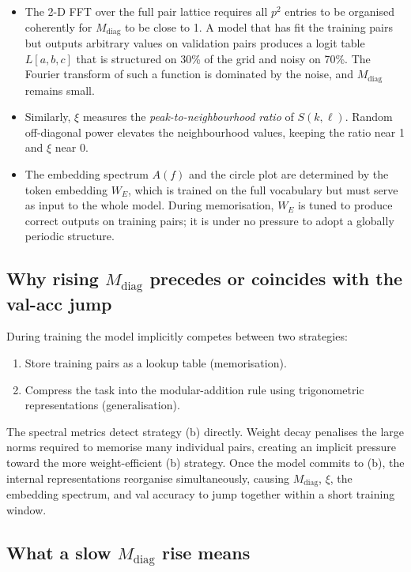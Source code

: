 \documentclass[11pt]{article}
\newcommand{\diag}{\mathrm{diag}}
\begin{document}
\begin{itemize}
    \item The 2-D FFT over the full pair lattice requires all $p^2$ entries
    to be organised coherently for $M_{\diag}$ to be close to 1.
    A model that has fit the training pairs but outputs arbitrary values on
    validation pairs produces a logit table $L[a,b,c]$ that is structured
    on 30\% of the grid and noisy on 70\%.
    The Fourier transform of such a function is dominated by the noise, and
    $M_{\diag}$ remains small.

    \item Similarly, $\xi$ measures the \emph{peak-to-neighbourhood ratio}
    of $S(k,\ell)$.
    Random off-diagonal power elevates the neighbourhood values, keeping the
    ratio near 1 and $\xi$ near 0.

    \item The embedding spectrum $A(f)$ and the circle plot are determined
    by the token embedding $W_E$, which is trained on the full vocabulary
    but must serve as input to the whole model.
    During memorisation, $W_E$ is tuned to produce correct outputs on training
    pairs; it is under no pressure to adopt a globally periodic structure.
\end{itemize}

\subsection{Why rising $M_{\diag}$ precedes or coincides with the val-acc jump}

During training the model implicitly competes between two strategies:
\begin{enumerate}[label=(\alph*)]
    \item Store training pairs as a lookup table (memorisation).
    \item Compress the task into the modular-addition rule using trigonometric
    representations (generalisation).
\end{enumerate}
The spectral metrics detect strategy (b) directly.
Weight decay penalises the large norms required to memorise many individual
pairs, creating an implicit pressure toward the more weight-efficient
(b) strategy.
Once the model commits to (b), the internal representations reorganise
simultaneously, causing $M_{\diag}$, $\xi$, the embedding spectrum, and
val accuracy to jump together within a short training window.

\subsection{What a slow $M_{\diag}$ rise means}
\end{document}
